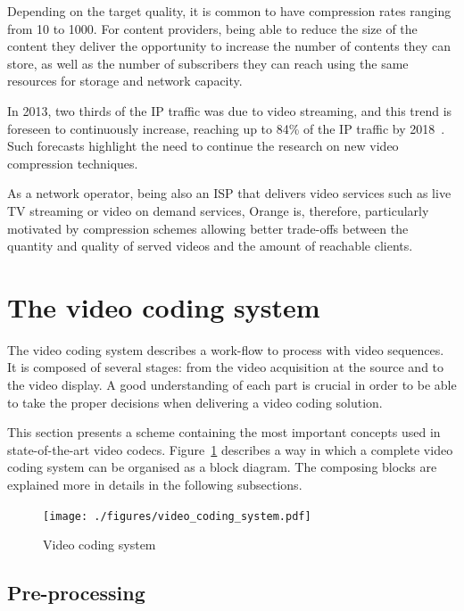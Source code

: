 \documentclass[11pt,a4paper,openright,twoside]{book}
\def\usepdfs{1} %
\numberwithin{equation}{section} %
\numberwithin{figure}{section} %
\numberwithin{table}{section} %
\begin{document}
Depending on the target quality, it is common to have compression rates
ranging from 10 to 1000.
For content providers, being able to reduce the size of the content they
deliver the opportunity to increase the number of contents they can store, as
well as the number of subscribers they can reach using the same resources for
storage and network capacity.

In 2013, two thirds of the \ac{IP} traffic was due to video
streaming, and this trend is foreseen to continuously increase, reaching up to
84\% of the \acs{IP} traffic by 2018~\cite{cisco-13-vni-forecast}.
Such forecasts highlight the need to continue the research on new video
compression techniques.

As a network operator, being also an \ac{ISP} that delivers video services
such as live TV streaming or video on demand services, Orange is, therefore,
particularly motivated by compression schemes allowing better trade-offs
between the quantity and quality of served videos and the amount of reachable
clients.

\section{The video coding system}
\label{sec:the_video_coding_system}

The video coding system describes a work-flow to process with video sequences.
It is composed of several stages:
from the video acquisition at the source and to the video display.
A good understanding of each part is crucial in order to be able to take the
proper decisions when delivering a video coding solution.

This section presents a scheme containing the most important concepts
used in state-of-the-art video codecs.
Figure~\ref{fig:video_coding_system} describes a way in which a complete video
coding system can be organised as a block diagram.
The composing blocks are explained more in details in the following
subsections.

\begin{figure}[tb]
	\centering
	\ifthenelse{\usepdfs = 0}
	{}
	{\texttt{[image: ./figures/video\_coding\_system.pdf]}}
	\caption{Video coding system}
	\label{fig:video_coding_system}
\end{figure}

\subsection{Pre-processing}
\label{sub:pre_processing}
\end{document}
